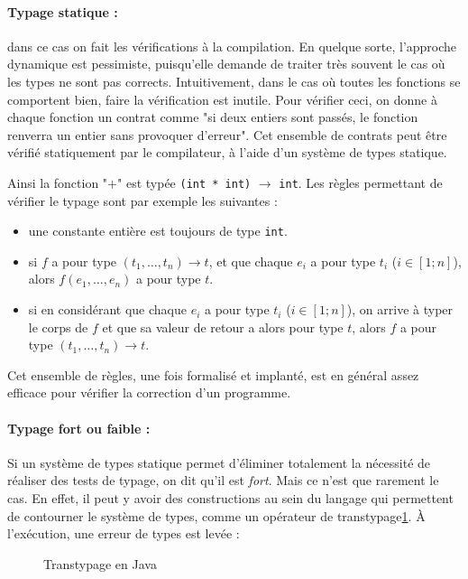 \paragraph{Typage statique :} dans ce cas on fait les vérifications à la
compilation. En quelque sorte, l'approche dynamique est pessimiste, puisqu'elle
demande de traiter très souvent le cas où les types ne sont pas corrects.
Intuitivement, dans le cas où toutes les fonctions se comportent bien, faire la
vérification est inutile. Pour vérifier ceci, on donne à chaque fonction un
contrat comme "si deux entiers sont passés, le fonction renverra un entier sans
provoquer d'erreur". Cet ensemble de contrats peut être vérifié statiquement par
le compilateur, à l'aide d'un système de types statique.


Ainsi la fonction "$+$" est typée \texttt{(int * int)} $→$ \texttt{int}. Les
règles permettant de vérifier le typage sont par exemple les suivantes :

\begin{itemize}
\item
  une constante entière est toujours de type \texttt{int}.
\item
  si $f$ a pour type $(t_1, …, t_n) → t$, et que chaque $e_i$ a pour type $t_i$
  ($i ∈ [1;n]$), alors $f(e_1, …, e_n)$ a pour type $t$.
\item
  si en considérant que chaque $e_i$ a pour type $t_i$ ($i ∈ [1;n]$),
  on arrive à typer le corps de $f$ et que sa valeur de retour a alors
  pour type $t$,
  alors $f$ a pour type $(t_1, …, t_n) → t$.
\end{itemize}

Cet ensemble de règles, une fois formalisé et implanté, est en général assez
efficace pour vérifier la correction d'un programme.

\paragraph{Typage fort ou faible :}

Si un système de types statique permet d'éliminer totalement la nécessité de
réaliser des tests de typage, on dit qu'il est \emph{fort}. Mais ce n'est que
rarement le cas. En effet, il peut y avoir des constructions au sein du langage
qui permettent de contourner le système de types, comme un opérateur de
transtypage\ref{fig:javacast}. À l'exécution, une erreur de types est levée :

\begin{figure}
  \caption{Transtypage en Java}
  \label{fig:javacast}
\end{figure}

